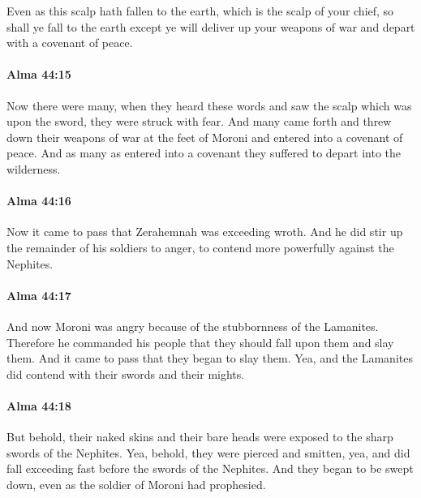 			Even as this scalp hath fallen to the earth,
			which is the scalp of your chief,
			so shall ye fall to the earth
			except ye will deliver up your weapons of war
			and depart with a covenant of peace.

		\paragraph{Alma 44:15} %
			\label{ALMA-44-15}

			Now there were many, when they heard these words
			and saw the scalp which was upon the sword,
			they were struck with fear.
			And many came forth and threw down their weapons of war at the feet of Moroni
			and entered into a covenant of peace.
			And as many as entered into a covenant
			they suffered to depart into the wilderness.

		\paragraph{Alma 44:16} %
			\label{ALMA-44-16}

			Now it came to pass that Zerahemnah was exceeding wroth.
			And he did stir up the remainder of his soldiers to anger,
			to contend more powerfully against the Nephites.

		\paragraph{Alma 44:17} %
			\label{ALMA-44-17}

			And now Moroni was angry because of the stubbornness of the Lamanites.
			Therefore he commanded his people
			that they should fall upon them and slay them.
			And it came to pass that they began to slay them.
			Yea, and the Lamanites did contend with their swords and their mights.

		\paragraph{Alma 44:18} %
			\label{ALMA-44-18}

			But behold, their naked skins and their bare heads were exposed
			to the sharp swords of the Nephites.
			Yea, behold, they were pierced and smitten,
			yea, and did fall exceeding fast before the swords of the Nephites.
			And they began to be swept down,
			even as the soldier of Moroni had prophesied.

